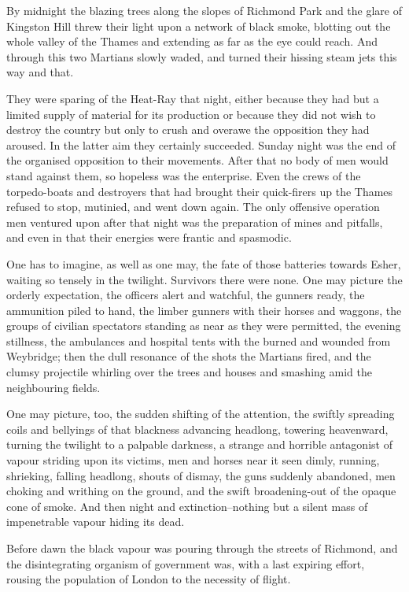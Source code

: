By midnight the blazing trees along the slopes of Richmond Park and
the glare of Kingston Hill threw their light upon a network of
black smoke, blotting out the whole valley of the Thames and
extending as far as the eye could reach. And through this two
Martians slowly waded, and turned their hissing steam jets this way
and that.

They were sparing of the Heat-Ray that night, either because they
had but a limited supply of material for its production or because
they did not wish to destroy the country but only to crush and
overawe the opposition they had aroused. In the latter aim they
certainly succeeded. Sunday night was the end of the organised
opposition to their movements. After that no body of men would
stand against them, so hopeless was the enterprise. Even the crews
of the torpedo-boats and destroyers that had brought their
quick-firers up the Thames refused to stop, mutinied, and went down
again. The only offensive operation men ventured upon after that
night was the preparation of mines and pitfalls, and even in that
their energies were frantic and spasmodic.

One has to imagine, as well as one may, the fate of those batteries
towards Esher, waiting so tensely in the twilight. Survivors there
were none. One may picture the orderly expectation, the officers
alert and watchful, the gunners ready, the ammunition piled to
hand, the limber gunners with their horses and waggons, the groups
of civilian spectators standing as near as they were permitted, the
evening stillness, the ambulances and hospital tents with the
burned and wounded from Weybridge; then the dull resonance of the
shots the Martians fired, and the clumsy projectile whirling over
the trees and houses and smashing amid the neighbouring fields.

One may picture, too, the sudden shifting of the attention, the
swiftly spreading coils and bellyings of that blackness advancing
headlong, towering heavenward, turning the twilight to a palpable
darkness, a strange and horrible antagonist of vapour striding upon
its victims, men and horses near it seen dimly, running, shrieking,
falling headlong, shouts of dismay, the guns suddenly abandoned,
men choking and writhing on the ground, and the swift
broadening-out of the opaque cone of smoke. And then night and
extinction--nothing but a silent mass of impenetrable vapour hiding
its dead.

Before dawn the black vapour was pouring through the streets of
Richmond, and the disintegrating organism of government was, with a
last expiring effort, rousing the population of London to the
necessity of flight.

